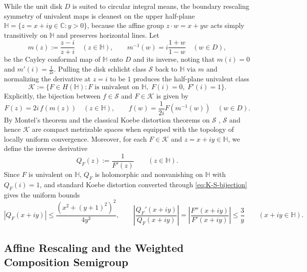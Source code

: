\documentclass[12pt]{article}
\def\C{\mathbb{C}}
\def\H{\mathbb{H}}
\def\K{\mathcal{K}}
\def\S{\mathcal{S}}
\theoremstyle{definition}
\numberwithin{equation}{section}
\begin{document}
While the unit disk $D$ is suited to circular integral means, the boundary rescaling symmetry of univalent maps is cleanest on the upper half-plane $\H = \{z = x + iy \in \C : y > 0\}$, because the affine group $z \cdot w = x + yw$ acts simply transitively on $\H$ and preserves horizontal lines. Let
\begin{equation}\label{eq:cayley-def}
  m(z) := \frac{z - i}{z + i} \quad (z \in \H), \qquad m^{-1}(w) = i \frac{1 + w}{1 - w} \quad (w \in D),
\end{equation}
be the Cayley conformal map of $\H$ onto $D$ and its inverse, noting that $m(i) = 0$ and $m'(i) = \frac{1}{2i}$. Pulling the disk schlicht class $\S$ back to $\H$ via $m$ and normalizing the derivative at $z = i$ to be $1$ produces the half-plane univalent class
\begin{equation}\label{eq:K-class-def}
  \K := \Big\{F \in H(\H) : F \text{ is univalent on } \H,\; F(i) = 0,\; F'(i) = 1\Big\}.
\end{equation}
Explicitly, the bijection between $f \in \S$ and $F \in \K$ is given by
\begin{equation}\label{eq:K-S-bijection}
  F(z) = 2i \, f(m(z)) \quad (z \in \H), \qquad f(w) = \frac{1}{2i} F(m^{-1}(w)) \quad (w \in D).
\end{equation}
By Montel's theorem and the classical Koebe distortion theorems on $\S$ \cite[Theorem~2.5]{Dur83}, $\S$ and hence $\K$ are compact metrizable spaces when equipped with the topology of locally uniform convergence. Moreover, for each $F \in \K$ and $z = x+iy \in \H$, we define the inverse derivative
\begin{equation}\label{eq:QF-def}
  Q_F(z) := \frac{1}{F'(z)} \qquad (z \in \H).
\end{equation}
Since $F$ is univalent on $\H$, $Q_F$ is holomorphic and nonvanishing on $\H$ with $Q_F(i) = 1$, and standard Koebe distortion converted through \eqref{eq:K-S-bijection} gives the uniform bounds
\begin{equation}\label{eq:QF-distortion}
  |Q_F(x+iy)| \le \frac{(x^2 + (y+1)^2)^2}{4 y^3}, \qquad \left|\frac{Q_F'(x+iy)}{Q_F(x+iy)}\right| = \left|\frac{F''(x+iy)}{F'(x+iy)}\right| \le \frac{3}{y} \qquad (x+iy \in \H).
\end{equation}

\subsection{Affine Rescaling and the Weighted Composition Semigroup}
\end{document}
